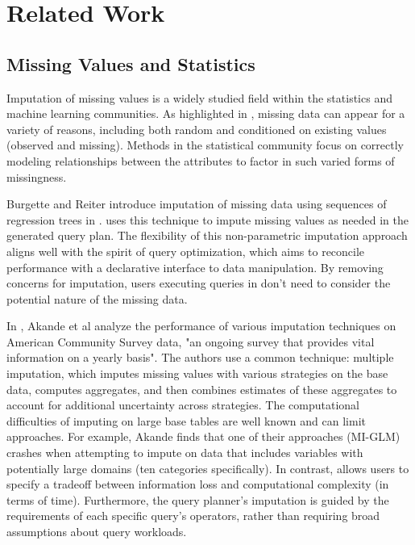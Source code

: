 \section{Related Work}
\subsection{Missing Values and Statistics}
Imputation of missing values is a widely studied field within the statistics and machine
learning communities. As highlighted in \cite{gelman2006data}, missing data
can appear for a variety of reasons, including both random and conditioned on
existing values (observed and missing). Methods in the statistical community
focus on correctly modeling relationships between the attributes to factor in
such varied forms of missingness.

Burgette and Reiter introduce imputation of missing data using sequences
of regression trees in \cite{burgette2010multiple}. \ProjectName{} uses
this technique to impute missing values as needed in the generated query plan.
The flexibility of this non-parametric imputation approach aligns well with the
spirit of query optimization, which aims to reconcile performance with a declarative interface to
data manipulation. By removing concerns for imputation, users executing queries
in \ProjectName{} don't need to consider the potential nature of the missing data.

In \cite{akande2015empirical}, Akande et al analyze the performance of various
imputation techniques on American Community Survey data, "an ongoing survey
that provides vital information on a yearly basis"\cite{censusbureau}. The authors
use a common technique: multiple imputation, which imputes missing values
with various strategies on the base data, computes aggregates, and then
combines estimates of these aggregates to account for additional uncertainty across
strategies. The computational difficulties of imputing on large base tables
are well known and can limit approaches. For example, Akande finds that
one of their approaches (MI-GLM) crashes when attempting to impute on data that
includes variables with potentially large domains (ten categories specifically).
 In contrast, \ProjectName{} allows users to specify a tradeoff
between information loss and computational complexity (in terms of time). 
Furthermore, the query planner's imputation is guided by the requirements of
each specific query's operators, rather than requiring broad assumptions
about query workloads.


